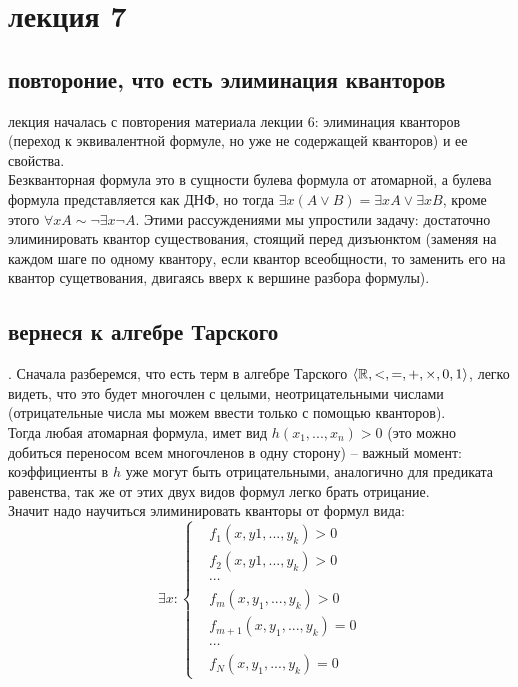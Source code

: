 \section{лекция 7}
\subsection{повтороние, что есть элиминация кванторов}
лекция началась с повторения материала лекции 6:
элиминация кванторов (переход к эквивалентной формуле, но уже не содержащей кванторов) и ее свойства.\\
Безкванторная формула это в сущности булева формула от атомарной, а булева формула представляется как ДНФ, но тогда $ \exists x (A \lor B) = \exists x A \lor \exists x B $, кроме этого  $\forall x A \sim \neg \exists x \neg A$.
Этими рассуждениями мы упростили задачу: достаточно элиминировать квантор существования, стоящий перед дизъюнктом (заменяя на каждом шаге по одному квантору, если квантор всеобщности, то заменить его на квантор сущетвования, двигаясь вверх к вершине разбора формулы).\\
\subsection{вернеся к алгебре Тарского}.
Сначала разберемся, что есть терм в алгебре Тарского $\left \langle \mathbb{R}, <, = ,  +, \times, 0, 1 \right \rangle$, легко видеть, что это будет многочлен с целыми, неотрицательными числами (отрицательные числа мы можем ввести только с помощью кванторов).\\
Тогда любая атомарная формула, имет вид $h(x_1, ... , x_n) > 0$ (это можно добиться переносом всем многочленов в одну сторону) -- важный момент: коэффициенты в $h$ уже могут быть отрицательными, аналогично для предиката равенства, так же от этих двух видов формул легко брать отрицание.\\
Значит надо научиться элиминировать кванторы от формул вида:
\begin{equation}
    \exists x : \left\{  \begin{aligned} 
                            & f_1(x, y1, ... ,y_{k}) > 0 \\
                            & f_2(x, y1, ... ,y_{k}) > 0 \\
                            & \cdots \\ 
                            & f_m(x , y_1, ... , y_k) > 0 \\
                            & f_{m+1}(x, y_1, ... , y_k) = 0 \\
                            & \cdots \\
                            & f_{N} (x, y_1, ... , y_k) = 0
                        \end{aligned}  
    \right.
\end{equation}
